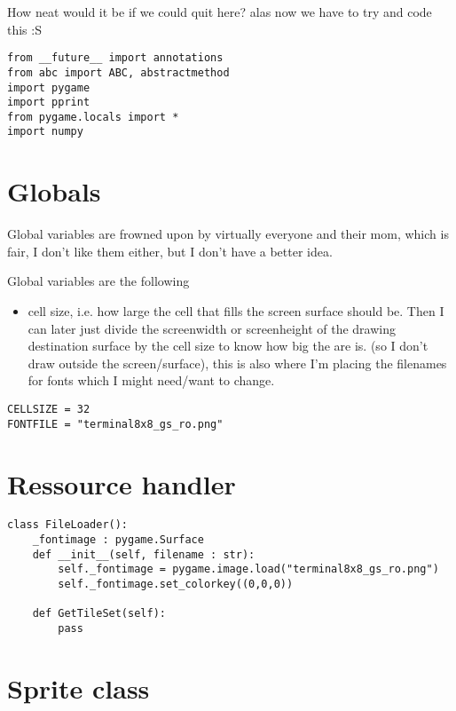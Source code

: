\documentclass[11pt]{article}
\begin{document}
How neat would it be if we could quit here? alas now we have to try and code this :S 




\begin{verbatim}
from __future__ import annotations
from abc import ABC, abstractmethod
import pygame
import pprint
from pygame.locals import *
import numpy
\end{verbatim}

\section{Globals}
\label{sec:orgfcf5f73}

Global variables are frowned upon by virtually everyone and their mom, which is fair, I don't like them either, but I don't have a better idea.

Global variables are the following
\begin{itemize}
\item cell size, i.e. how large the cell that fills the screen surface should be. Then I can later just divide the screenwidth or screenheight of the drawing destination surface by the cell size to know how big the are is. (so I don't draw outside the screen/surface), this is also where I'm placing the filenames for fonts which I might need/want to change.
\end{itemize}


\begin{verbatim}
CELLSIZE = 32
FONTFILE = "terminal8x8_gs_ro.png"
\end{verbatim}

\section{Ressource handler}
\label{sec:org2c00a0c}

\begin{verbatim}
class FileLoader():
    _fontimage : pygame.Surface
    def __init__(self, filename : str):
        self._fontimage = pygame.image.load("terminal8x8_gs_ro.png")
        self._fontimage.set_colorkey((0,0,0))

    def GetTileSet(self):
        pass
\end{verbatim}

\section{Sprite class}
\label{sec:org27b1f7b}
\end{document}
